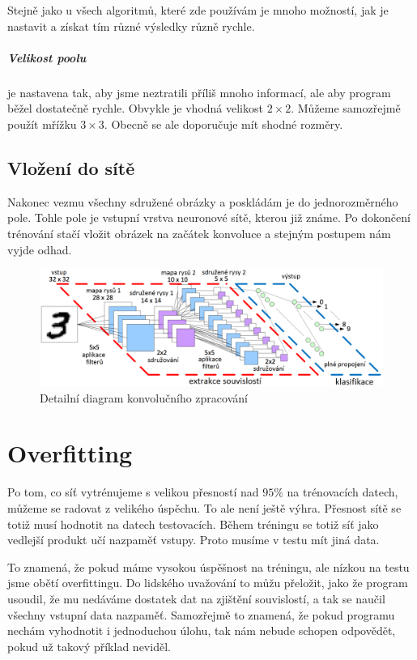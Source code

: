 \documentclass[12pt,a4paper]{report}
\begin{document}
Stejně jako u všech algoritmů, které zde používám je mnoho možností, jak je nastavit a získat tím různé výsledky různě rychle.
\paragraph{Velikost poolu}
je nastavena tak, aby jsme neztratili příliš mnoho informací, ale aby program běžel dostatečně rychle. Obvykle je vhodná velikost $2\times2$. Můžeme samozřejmě použít mřížku $3\times3$. Obecně se ale doporučuje mít shodné rozměry.
\section{Vložení do sítě}
Nakonec vezmu všechny sdružené obrázky a poskládám je do jednorozměrného pole. Tohle pole je vstupní vrstva neuronové sítě, kterou již známe. Po dokončení trénování stačí vložit obrázek na začátek konvoluce a stejným postupem nám vyjde odhad.

\begin{figure}[h]
	\centering
	\includegraphics[width=17cm]{images/convolution}
	\caption{Detailní diagram konvolučního zpracování \cite{kernix}}
\end{figure}

\chapter{Overfitting}
Po tom, co síť vytrénujeme s velikou přesností nad $95\%$ na trénovacích datech, můžeme se radovat z velikého úspěchu. To ale není ještě výhra. Přesnost sítě se totiž musí hodnotit na datech testovacích. Během tréningu se totiž síť jako vedlejší produkt učí nazpaměť vstupy. Proto musíme v testu mít jiná data.

To znamená, že pokud máme vysokou úspěšnost na tréningu, ale nízkou na testu jsme obětí overfittingu. Do lidského uvažování to můžu přeložit, jako že program usoudil, že mu nedáváme dostatek dat na zjištění souvislostí, a tak se naučil všechny vstupní data nazpaměť. Samozřejmě to znamená, že pokud programu nechám vyhodnotit i jednoduchou úlohu, tak nám nebude schopen odpovědět, pokud už takový příklad neviděl.
\end{document}
